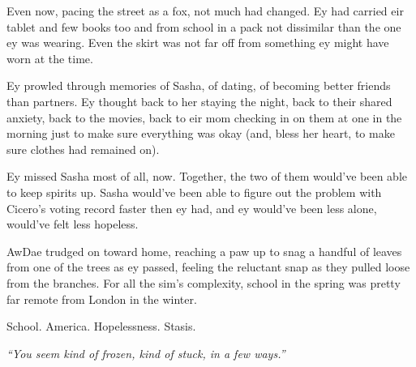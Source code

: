 Even now, pacing the street as a fox, not much had changed. Ey had carried eir tablet and few books too and from school in a pack not dissimilar than the one ey was wearing. Even the skirt was not far off from something ey might have worn at the time.

Ey prowled through memories of Sasha, of dating, of becoming better friends than partners. Ey thought back to her staying the night, back to their shared anxiety, back to the movies, back to eir mom checking in on them at one in the morning just to make sure everything was okay (and, bless her heart, to make sure clothes had remained on).

Ey missed Sasha most of all, now. Together, the two of them would've been able to keep spirits up. Sasha would've been able to figure out the problem with Cicero's voting record faster then ey had, and ey would've been less alone, would've felt less hopeless.

AwDae trudged on toward home, reaching a paw up to snag a handful of leaves from one of the trees as ey passed, feeling the reluctant snap as they pulled loose from the branches. For all the sim's complexity, school in the spring was pretty far remote from London in the winter.

School. America. Hopelessness. Stasis.

\emph{``You seem kind of frozen, kind of stuck, in a few ways.''}
